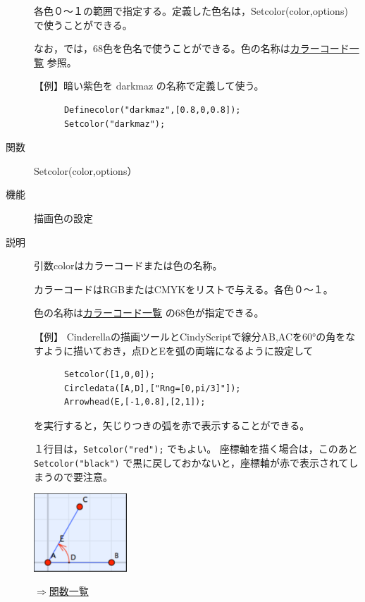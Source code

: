 \documentclass[papersize,a4paper,12pt,uplatex]{jsarticle}
\begin{document}
\begin{description}
各色０〜１の範囲で指定する。定義した色名は，Setcolor(color,options)  で使うことができる。

なお，\ketcindy では，68色を色名で使うことができる。色の名称は\hyperlink{colorcodelist}{カラーコード一覧} 参照。

\vspace{\baselineskip}
  【例】暗い紫色を darkmaz の名称で定義して使う。
\begin{verbatim}
      Definecolor("darkmaz",[0.8,0,0.8]);
      Setcolor("darkmaz");
\end{verbatim}


\vspace{\baselineskip}
\hypertarget{setcolor}{}
\item[関数]  Setcolor(color,options）
\item[機能]  描画色の設定
\item[説明]  引数colorはカラーコードまたは色の名称。

カラーコードはRGBまたはCMYKをリストで与える。各色０〜１。
  
色の名称は\hyperlink{colorcodelist}{カラーコード一覧} の68色が指定できる。


\vspace{\baselineskip}
【例】  Cinderellaの描画ツールとCindyScriptで線分AB,ACを60°の角をなすように描いておき，点DとEを弧の両端になるように設定して
\begin{verbatim}
      Setcolor([1,0,0]);
      Circledata([A,D],["Rng=[0,pi/3]"]);
      Arrowhead(E,[-1,0.8],[2,1]);
\end{verbatim}
を実行すると，矢じりつきの弧を赤で表示することができる。
  
１行目は，\verb|Setcolor("red");|  でもよい。
座標軸を描く場合は，このあと \verb|Setcolor("black")| で黒に戻しておかないと，座標軸が赤で表示されてしまうので要注意。


\vspace{\baselineskip}
\hspace{20mm} \includegraphics[width=3.5cm,bb=0 0 161 134]{Fig/setcolor.pdf} 

\begin{flushright}  \hyperlink{functionlist}{$\Rightarrow$関数一覧}\end{flushright}


\end{description}
\end{document}
